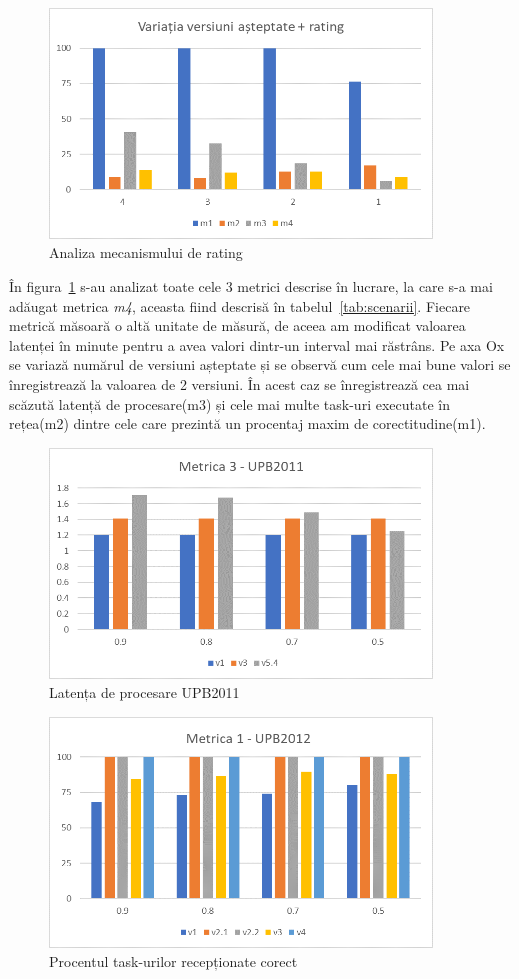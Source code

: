 \documentclass[12pt,a4paper]{report}
\begin{document}
\begin{figure}[th]
\centering
\includegraphics[width=4in]{pics/graphics/grafic3.png}
  \caption[]{Analiza mecanismului de rating}
  \label{fig:versiuniRating}
\end{figure}
În figura~\ref{fig:versiuniRating} s-au analizat toate cele 3 metrici descrise în lucrare, la care s-a mai adăugat metrica \textit{m4}, aceasta fiind descrisă în tabelul~\ref{tab:scenarii}. Fiecare metrică măsoară o altă unitate de măsură, de aceea am modificat valoarea latenței în minute pentru a avea valori dintr-un interval mai răstrâns. Pe axa Ox se variază numărul de versiuni așteptate și se observă cum cele mai bune valori se înregistrează la valoarea de 2 versiuni. În acest caz se înregistrează cea mai scăzută latență de procesare(m3) și cele mai multe task-uri executate în rețea(m2) dintre cele care prezintă un procentaj maxim de corectitudine(m1). 

\iftrue
\begin{figure}[th]
\centering
\includegraphics[width=4in]{pics/graphics/grafic10.png}
  \caption[]{Latența de procesare UPB2011}
  \label{grafic10}
\end{figure}
\fi

\iftrue
\begin{figure}[th]
\centering
\includegraphics[width=4in]{pics/graphics/grafic11.png}
  \caption[]{Procentul task-urilor recepționate corect}
  \label{grafic11}
\end{figure}
\fi
\end{document}

